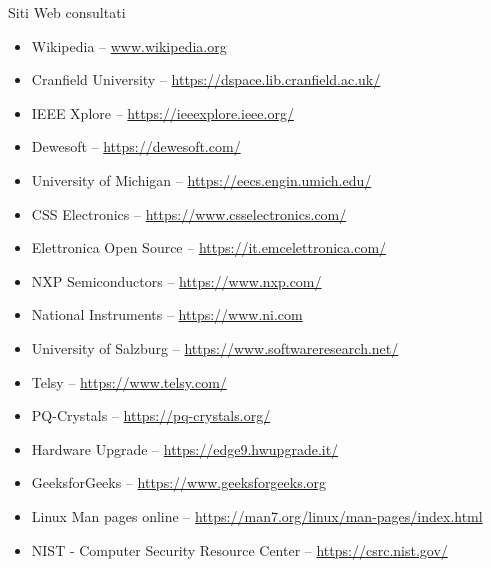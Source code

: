 \cleardoublepage
{}
{}
\nocite{*}


%

\vspace{2.5cm}
\begin{Large}Siti Web consultati\end{Large}
\begin{itemize}
    \item Wikipedia -- \url{www.wikipedia.org}
    \item Cranfield University -- \url{https://dspace.lib.cranfield.ac.uk/}
    \item IEEE Xplore -- \url{https://ieeexplore.ieee.org/}
    \item Dewesoft -- \url{https://dewesoft.com/}
    \item University of Michigan -- \url{https://eecs.engin.umich.edu/}
    \item CSS Electronics -- \url{https://www.csselectronics.com/}
    \item Elettronica Open Source -- \url{https://it.emcelettronica.com/}
    \item NXP Semiconductors -- \url{https://www.nxp.com/}
    \item National Instruments -- \url{https://www.ni.com}
    \item University of Salzburg -- \url{https://www.softwareresearch.net/}
    \item Telsy -- \url{https://www.telsy.com/}
    \item PQ-Crystals -- \url{https://pq-crystals.org/}
    \item Hardware Upgrade -- \url{https://edge9.hwupgrade.it/}
    \item GeeksforGeeks -- \url{https://www.geeksforgeeks.org}
    \item Linux Man pages online -- \url{https://man7.org/linux/man-pages/index.html}
    \item NIST - Computer Security Resource Center -- \url{https://csrc.nist.gov/}
\end{itemize}

